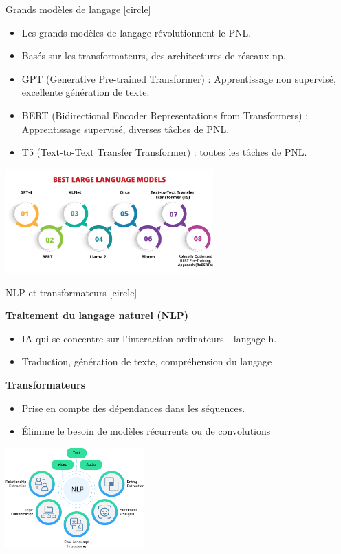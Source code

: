 \documentclass{beamer}
\begin{document}
\begin{frame}[t]{Grands modèles de langage}
	[circle]
	\begin{itemize}
		\item Les grands modèles de langage révolutionnent le PNL.
		\item Basés sur les transformateurs, des architectures de réseaux np.

		\item GPT (Generative Pre-trained Transformer) : Apprentissage non supervisé, excellente génération de texte.
		\item BERT (Bidirectional Encoder Representations from Transformers) : Apprentissage supervisé, diverses tâches de PNL.
		\item T5 (Text-to-Text Transfer Transformer) : toutes les tâches de PNL.
	\end{itemize}
	\centering
\includegraphics[width=0.6\textwidth]{Best-Large-Language-Models.jpg}
\end{frame}




\begin{frame}[t]{NLP et transformateurs}
	[circle]
	
	\textbf{Traitement du langage naturel (NLP)}
	\begin{itemize}
		\item IA qui se concentre sur l'interaction ordinateurs - langage h.
		\item Traduction, génération de texte, compréhension du langage
	\end{itemize}
	
	\textbf{Transformateurs}
	\begin{itemize}
		\item Prise en compte des dépendances dans les séquences.
		\item Élimine le besoin de modèles récurrents ou de convolutions
	\end{itemize}

	\centering
	\includegraphics[width=0.4\textwidth]{blog-NLP-pic1.png}
\end{frame}
\end{document}
